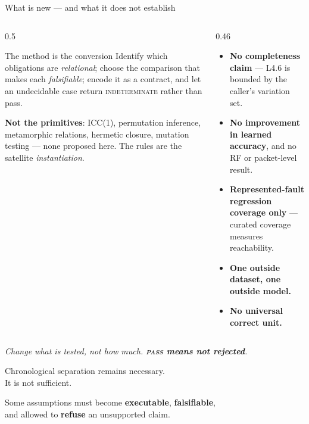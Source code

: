 \documentclass[aspectratio=169,11pt]{beamer}
\newcommand{\rulename}[1]{\textsf{#1}}
\newcommand{\msg}[1]{%
  \vfill\vspace{0.2em}%
  \begin{center}\begin{minipage}{0.92\textwidth}\centering
  \small\itshape\color{black!70}#1
  \end{minipage}\end{center}}
\begin{document}
\begin{frame}{What is new --- and what it does not establish}
  \begin{columns}[T,onlytextwidth]
    \begin{column}{0.5\textwidth}
      \begin{block}{The method is the conversion}
        {\small Identify which obligations are \emph{relational}; choose the comparison that makes
        each \emph{falsifiable}; encode it as a contract, and let an undecidable case return
        \textsc{indeterminate} rather than pass.}
      \end{block}
      {\small \textbf{Not the primitives}: ICC(1), permutation inference, metamorphic relations,
      hermetic closure, mutation testing --- none proposed here. The \Nrules{} rules are the
      satellite \emph{instantiation}.}
    \end{column}
    \begin{column}{0.46\textwidth}
      {\small
      \begin{itemize}\setlength\itemsep{0.35em}
        \item \textbf{No completeness claim} --- \rulename{L4.6} is bounded by the caller's
              variation set.
        \item \textbf{No improvement in learned accuracy}, and no RF or packet-level result.
        \item \textbf{Represented-fault regression coverage only} --- curated coverage measures
              reachability.
        \item \textbf{One outside dataset, one outside model.}
        \item \textbf{No universal correct unit.}
      \end{itemize}}
    \end{column}
  \end{columns}
  \msg{Change what is tested, not how much. \textbf{\textsc{pass} means not rejected}.}
\end{frame}

\addtocounter{framenumber}{1}
\begin{frame}[standout]
  Chronological separation remains necessary.\\
  It is not sufficient.

  \vspace{0.9em}
  {\normalsize\normalfont
  Some assumptions must become \textbf{executable}, \textbf{falsifiable},\\
  and allowed to \textbf{refuse} an unsupported claim.}
\end{frame}
\end{document}
